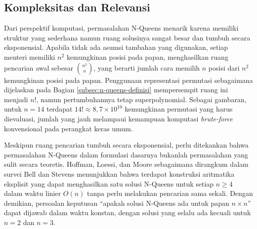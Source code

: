 \subsection{Kompleksitas dan Relevansi}
\label{subsec:n-queens-kompleksitas}
Dari perspektif komputasi, permasalahan N-Queens menarik karena memiliki struktur yang sederhana namun ruang solusinya sangat besar dan tumbuh secara eksponensial. Apabila tidak ada asumsi tambahan yang digunakan, setiap menteri memiliki $n^2$ kemungkinan posisi pada papan, menghasilkan ruang pencarian awal sebesar $\binom{n^2}{n}$, yang berarti jumlah cara memilih $n$ posisi dari $n^2$ kemungkinan posisi pada papan. Penggunaan representasi permutasi sebagaimana dijelaskan pada Bagian \ref{subsec:n-queens-definisi} mempersempit ruang ini menjadi $n!$, namun pertumbuhannya tetap superpolynomial. Sebagai gambaran, untuk $n = 14$ terdapat $14! \approx 8{,}7 \times 10^{10}$ kemungkinan permutasi yang harus dievaluasi, jumlah yang jauh melampaui kemampuan komputasi \textit{brute-force} konvensional pada perangkat keras umum.

Meskipun ruang pencarian tumbuh secara eksponensial, perlu ditekankan bahwa permasalahan N-Queens dalam formulasi dasarnya bukanlah permasalahan yang sulit secara teoretis. Hoffman, Loessi, dan Moore \cite{hoffman1969constructions} sebagaimana dirangkum dalam survei Bell dan Stevens \cite{bell2009survey} menunjukkan bahwa terdapat konstruksi aritmatika eksplisit yang dapat menghasilkan satu solusi N-Queens untuk setiap $n \geq 4$ dalam waktu linier $O(n)$ tanpa perlu melakukan pencarian sama sekali. Dengan demikian, persoalan keputusan ``apakah solusi N-Queens ada untuk papan $n \times n$'' dapat dijawab dalam waktu konstan, dengan solusi yang selalu ada kecuali untuk $n = 2$ dan $n = 3$.

